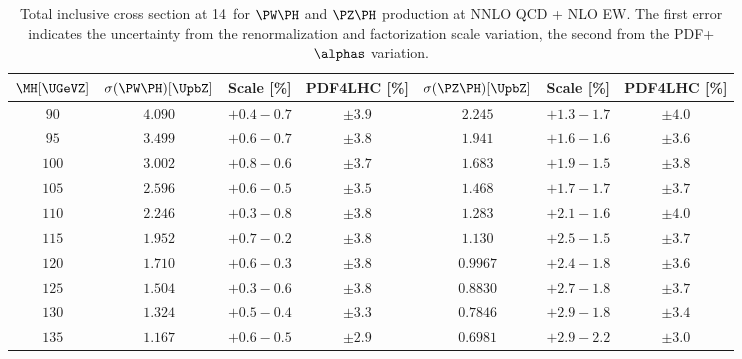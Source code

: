 \begin{table}
    \begin{center}
      \caption[]{\label{tab:wzh14}Total inclusive cross section at
  14\UTeV\ for $\PW\PH$ and $\PZ\PH$ production at NNLO QCD + NLO
  EW. The first error indicates the uncertainty from the renormalization
  and factorization scale variation, the second from the PDF+$\alphas$
  variation.}
%      
   \small
   \begin{tabular}{ccccccc}
   \hline
$\MH[\UGeVZ]$ & $\sigma(\PW\PH)[\UpbZ]$ & Scale [\%] & PDF4LHC [\%] &
$\sigma(\PZ\PH)[\UpbZ]$ & Scale [\%] & PDF4LHC [\%]
\\ \hline
$ 90 $ & $    4.090 $ & $   +0.4   -\!0.7  $ & 
$ \pm 3.9 $
 & $    2.245 $ & $  +1.3   -\!1.7  $ &
$ \pm 4.0 $ \\[.2em]

$ 95 $ & $    3.499 $ & $   +0.6   -\!0.7  $ & 
$ \pm 3.8 $
 & $    1.941 $ & $   +1.6   -\!1.6  $ &
$ \pm 3.6 $ \\[.2em]

$ 100 $ & $    3.002 $ & $   +0.8   -\!0.6  $ & 
$ \pm 3.7 $
 & $    1.683 $ & $   +1.9   -\!1.5  $ &
$ \pm 3.8 $ \\[.2em]

$ 105 $ & $    2.596 $ & $   +0.6   -\!0.5  $ & 
$ \pm 3.5 $
 & $    1.468 $ & $   +1.7   -\!1.7  $ &
$ \pm 3.7 $ \\[.2em]

$ 110 $ & $    2.246 $ & $   +0.3   -\!0.8  $ & 
$ \pm 3.8 $
 & $    1.283 $ & $   +2.1   -\!1.6  $ &
$ \pm 4.0 $ \\[.2em]

$ 115 $ & $    1.952 $ & $   +0.7   -\!0.2  $ & 
$ \pm 3.8 $
 & $    1.130 $ & $   +2.5   -\!1.5  $ &
$ \pm 3.7 $ \\[.2em]

$ 120 $ & $    1.710 $ & $   +0.6   -\!0.3  $ & 
$ \pm 3.8 $
 & $   0.9967 $ & $   +2.4   -\!1.8  $ &
$ \pm 3.6 $ \\[.2em]

$ 125 $ & $    1.504 $ & $   +0.3   -\!0.6  $ & 
$ \pm 3.8 $
 & $   0.8830 $ & $   +2.7   -\!1.8  $ &
$ \pm 3.7 $ \\[.2em]

$ 130 $ & $    1.324 $ & $   +0.5   -\!0.4  $ & 
$ \pm 3.3 $
 & $   0.7846 $ & $   +2.9   -\!1.8  $ &
$ \pm 3.4 $ \\[.2em]

$ 135 $ & $    1.167 $ & $   +0.6   -\!0.5  $ & 
$ \pm 2.9 $
 & $   0.6981 $ & $   +2.9   -\!2.2  $ &
$ \pm 3.0 $ \\[.2em]


\end{tabular}
\end{center}
\end{table}
